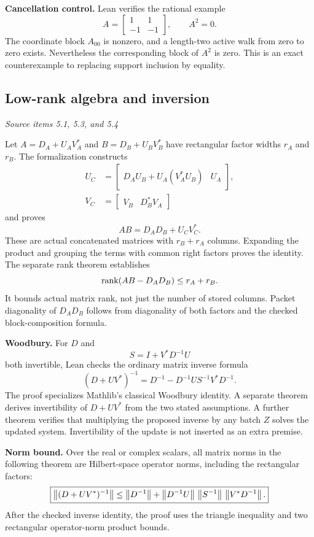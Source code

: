 \textbf{Cancellation control.} Lean verifies the rational example
\[
A=\begin{bmatrix}1&1\\-1&-1\end{bmatrix},\qquad A^2=0.
\]
The coordinate block $A_{00}$ is nonzero, and a length-two active walk from zero to zero exists. Nevertheless the corresponding block of $A^2$ is zero. This is an exact counterexample to replacing support inclusion by equality.



\subsection{Low-rank algebra and inversion}\label{supp1:subsection:003}\textit{Source items 5.1, 5.3, and 5.4}\par
Let $A=D_A+U_AV_A^*$ and $B=D_B+U_BV_B^*$ have rectangular factor widths $r_A$ and $r_B$. The formalization constructs
\begin{align*}
U_C&=\begin{bmatrix}D_AU_B+U_A(V_A^*U_B)&U_A\end{bmatrix},\\
V_C&=\begin{bmatrix}V_B&D_B^*V_A\end{bmatrix}
\end{align*}
and proves
\[
\boxed{AB=D_AD_B+U_CV_C^*.}
\]
These are actual concatenated matrices with $r_B+r_A$ columns. Expanding the product and grouping the terms with common right factors proves the identity. The separate rank theorem establishes
\[
\operatorname{rank}(AB-D_AD_B)\le r_A+r_B.
\]
It bounds actual matrix rank, not just the number of stored columns. Packet diagonality of $D_AD_B$ follows from diagonality of both factors and the checked block-composition formula.

\textbf{Woodbury.} For $D$ and
\[
S=I+V^*D^{-1}U
\]
both invertible, Lean checks the ordinary matrix inverse formula
\[
\boxed{(D+UV^*)^{-1}
=D^{-1}-D^{-1}US^{-1}V^*D^{-1}.}
\]
The proof specializes Mathlib's classical Woodbury identity. A separate theorem derives invertibility of $D+UV^*$ from the two stated assumptions. A further theorem verifies that multiplying the proposed inverse by any batch $Z$ solves the updated system. Invertibility of the update is not inserted as an extra premise.

\textbf{Norm bound.} Over the real or complex scalars, all matrix norms in the following theorem are Hilbert-space operator norms, including the rectangular factors:
\[
\boxed{
\left\lVert(D+UV^*)^{-1}\right\rVert
\le\left\lVert D^{-1}\right\rVert+
\left\lVert D^{-1}U\right\rVert\,\left\lVert S^{-1}\right\rVert\,\left\lVert V^*D^{-1}\right\rVert.
}
\]
After the checked inverse identity, the proof uses the triangle inequality and two rectangular operator-norm product bounds.

